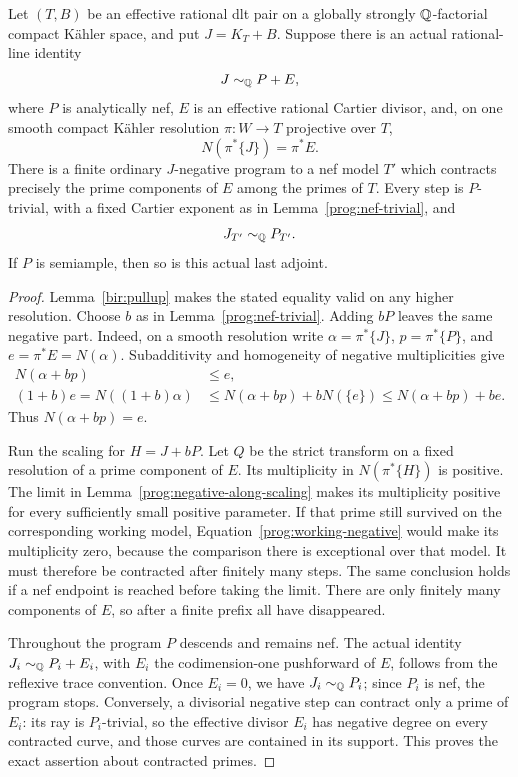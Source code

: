 \begin{proposition}
\label{prog:contract-negative}
Let \((T,B)\) be an effective rational dlt pair on a globally
strongly \(\mathbb Q\)-factorial compact Kähler space, and put \(J=K_T+B\).
Suppose there is an actual rational-line identity
\[
 J\sim_{\mathbb Q}P+E,
\]
where \(P\) is analytically nef, \(E\) is an effective rational
Cartier divisor, and, on one smooth compact Kähler resolution
\(\pi:W\to T\) projective over \(T\),
\[
 N(\pi^*\{J\})=\pi^*E.
\]
There is a finite ordinary \(J\)-negative program to a nef model
\(T'\) which contracts precisely the prime components of \(E\)
among the primes of \(T\).  Every step is \(P\)-trivial, with a
fixed Cartier exponent as in Lemma~\ref{prog:nef-trivial}, and
\[
 J_{T'}\sim_{\mathbb Q}P_{T'}.
\]
If \(P\) is semiample, then so is this actual last adjoint.
\end{proposition}

\begin{proof}
Lemma~\ref{bir:pullup} makes the stated equality valid on any
higher resolution.  Choose \(b\) as in
Lemma~\ref{prog:nef-trivial}.  Adding \(bP\) leaves the same
negative part.  Indeed, on a smooth resolution write
\(\alpha=\pi^*\{J\}\), \(p=\pi^*\{P\}\), and \(e=\pi^*E=N(\alpha)\).
Subadditivity and homogeneity of negative multiplicities give
\begin{align*}
 N(\alpha+bp)&\leq e,\\
 (1+b)e=N((1+b)\alpha)
 &\leq N(\alpha+bp)+bN(\{e\})
 \leq N(\alpha+bp)+be.
\end{align*}
Thus \(N(\alpha+bp)=e\).

Run the scaling for \(H=J+bP\).
Let \(Q\) be the strict transform on a fixed resolution of a prime
component of \(E\).  Its multiplicity in \(N(\pi^*\{H\})\) is
positive. The limit in Lemma~\ref{prog:negative-along-scaling} makes its multiplicity
positive for every sufficiently small positive parameter.  If
that prime still survived on the corresponding working model,
Equation~\eqref{prog:working-negative} would make its multiplicity zero,
because the comparison there is exceptional over that model.
It must therefore be contracted after finitely many steps.  The
same conclusion holds if a nef endpoint is reached before taking
the limit.  There are only finitely many components of \(E\), so
after a finite prefix all have disappeared.

Throughout the program \(P\) descends and remains nef.  The
actual identity \(J_i\sim_{\mathbb Q}P_i+E_i\), with \(E_i\) the
codimension-one pushforward of \(E\), follows from the reflexive
trace convention. Once \(E_i=0\), we have \(J_i\sim_{\mathbb Q}P_i\); since
\(P_i\) is nef, the program stops. Conversely, a divisorial negative step can
contract only a prime of \(E_i\): its ray is \(P_i\)-trivial,
so the effective divisor \(E_i\) has negative degree on every
contracted curve, and those curves are contained in its support.
This proves the exact assertion about contracted primes.
\end{proof}

